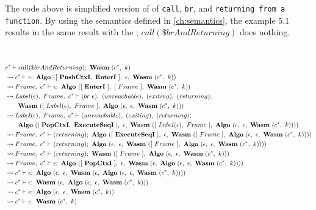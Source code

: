 The code above is simplified version of \spectecp{} of \texttt{call},
\texttt{br}, and \texttt{returning from a function}.
By using the semantics defined in \cref{ch:semantics}, the example 5.1 results
in the same result with the \officialp{}; $call(\$brAndReturning)$ does
nothing.


 \\
\begin{align}
  &c^* \vdash call(\$brAndReturning); ~ \textbf{Wasm} ~ (c^*, ~ k)
  \label{eq:resolve-1} \\
  &\leadsto c^* \vdash \epsilon; ~ \textbf{Algo} ~ ([ ~ \textbf{PushCtxI}, ~ \textbf{EnterI} ~ ], ~ \epsilon, ~ \textbf{Wasm} ~ (c^*, ~ k))
  \label{eq:resolve-2} \\
  &\leadsto Frame, ~ c^* \vdash \epsilon; ~ \textbf{Algo} ~ ([ ~ \textbf{EnterI} ~ ], ~ [ ~ Frame ~ ], ~ \textbf{Wasm} ~ (c^*, ~ k))
  \label{eq:resolve-3} \\
  &\leadsto Label(\epsilon), ~ Frame, ~ c^* \vdash (br ~ \epsilon), ~ (unreachable), ~ (exiting), ~ (returning); \\
  &\quad\quad \textbf{Wasm} ~ ([ ~ Label(\epsilon), ~ Frame ~ ], ~ \textbf{Algo} ~ (\epsilon, ~ \epsilon, ~ \textbf{Wasm} ~ (c^*, ~ k)))
  \label{eq:resolve-4} \\
  &\leadsto Label(\epsilon), ~ Frame, ~ c^* \vdash (unreachable), ~ (exiting), ~ (returning); \\
  &\quad\quad \textbf{Algo} ~ ([ ~ \textbf{PopCtxI}, ~ \textbf{ExecuteSeqI} ~ ], ~ \epsilon, ~ \textbf{Wasm} ~ ([ ~ Label(\epsilon), ~ Frame ~ ], ~ \textbf{Algo} ~ (\epsilon, ~ \epsilon, ~ \textbf{Wasm} ~ (c^*, ~ k))))
  \label{eq:resolve-5} \\
  &\leadsto Frame, ~ c^* \vdash (returning); ~
    \textbf{Algo} ~ ([ ~ \textbf{ExecuteSeqI} ~ ], ~ \epsilon, ~ \textbf{Wasm} ~ ([ ~ Frame ~ ], ~ \textbf{Algo} ~ (\epsilon, ~ \epsilon, ~ \textbf{Wasm} ~ (c^*, ~ k))))
  \label{eq:resolve-6} \\
  &\leadsto Frame, ~ c^* \vdash (returning); ~
    \textbf{Algo} ~ (\epsilon, ~ \epsilon, ~ \textbf{Wasm} ~ ([ ~ Frame ~ ], ~ \textbf{Algo} ~ (\epsilon, ~ \epsilon, ~ \textbf{Wasm} ~ (c^*, ~ k))))
  \label{eq:resolve-7} \\
  &\leadsto Frame, ~ c^* \vdash (returning); ~ \textbf{Wasm} ~ ([ ~ Frame ~ ], ~ \textbf{Algo} ~ (\epsilon, ~ \epsilon, ~ \textbf{Wasm} ~ (c^*, ~ k)))
  \label{eq:resolve-8} \\
  &\leadsto Frame, ~ c^* \vdash \epsilon; ~
    \textbf{Algo} ~ ([ ~ \textbf{PopCtxI} ~ ], ~ \epsilon, ~ \textbf{Wasm} ~ (\epsilon, ~ \textbf{Algo} ~ (\epsilon, ~ \epsilon, ~ \textbf{Wasm} ~ (c^*, ~ k))))
  \label{eq:resolve-9} \\
  &\leadsto c^* \vdash \epsilon; ~
    \textbf{Algo} ~ (\epsilon, ~ \epsilon, ~ \textbf{Wasm} ~ (\epsilon, ~ \textbf{Algo} ~ (\epsilon, ~ \epsilon, ~ \textbf{Wasm} ~ (c^*, ~ k))))
  \label{eq:resolve-10} \\
  &\leadsto c^* \vdash \epsilon; ~ \textbf{Wasm} ~ (\epsilon, ~ \textbf{Algo} ~ (\epsilon, ~ \epsilon, ~ \textbf{Wasm} ~ (c^*, ~ k)))
  \label{eq:resolve-11} \\
  &\leadsto c^* \vdash \epsilon; ~ \textbf{Algo} ~ (\epsilon, ~ \epsilon, ~ \textbf{Wasm} ~ (c^*, ~ k))
  \label{eq:resolve-12} \\
  &\leadsto c^* \vdash \epsilon; ~ \textbf{Wasm} ~ (c^*, ~ k)
  \label{eq:resolve-13}
\end{align}

